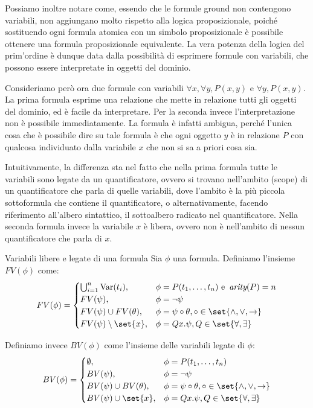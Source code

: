 Possiamo inoltre notare come, essendo che le formule ground non contengono variabili, non aggiungano molto rispetto alla logica proposizionale, poiché sostituendo ogni formula atomica con un simbolo proposizionale è possibile ottenere una formula proposizionale equivalente. La vera potenza della logica del prim'ordine è dunque data dalla possibilità di esprimere formule con variabili, che possono essere interpretate in oggetti del dominio.

Consideriamo però ora due formule con variabili \(\forall x, \forall y, P(x,y)\) e \(\forall y, P(x,y)\).
La prima formula esprime una relazione che mette in relazione tutti gli oggetti del dominio, ed è facile da interpretare.
Per la seconda invece l'interpretazione non è possibile immediatamente. La formula è infatti ambigua, perché l'unica cosa che è possibile dire su tale formula è che ogni oggetto \(y\) è in relazione \(P\) con qualcosa individuato dalla variabile \(x\) che non si sa a priori cosa sia.

Intuitivamente, la differenza sta nel fatto che nella prima formula tutte le variabili sono legate da un quantificatore, ovvero si trovano nell'ambito (scope) di un quantificatore che parla di quelle variabili, dove l'ambito è la più piccola sottoformula che contiene il quantificatore, o alternativamente, facendo riferimento all'albero sintattico, il sottoalbero radicato nel quantificatore. Nella seconda formula invece la variabile \(x\) è libera, ovvero non è nell'ambito di nessun quantificatore che parla di \(x\).

\begin{definition}{Variabili libere e legate di una formula}
  Sia \(\phi\) una formula. Definiamo l'insieme \(FV(\phi)\) come:
  \[FV(\phi) = \begin{cases}
    \bigcup_{i=1}^{n} \Var(t_i), & \phi = P(t_1,\ldots,t_n) \text{ e } \arty(P) = n\\
    FV(\psi), & \phi = \neg \psi\\
    FV(\psi)\cup FV(\theta), & \phi = \psi\circ\theta, \circ \in \set{\land,\lor,\to}\\
    FV(\psi)\setminus\set{x}, & \phi = Q x. \psi, Q\in\set{\forall,\exists}
  \end{cases}\]

  Definiamo invece \(BV(\phi)\) come l'insieme delle variabili legate di \(\phi\):
  \[BV(\phi) = \begin{cases}
    \emptyset, & \phi = P(t_1,\ldots,t_n)\\
    BV(\psi), & \phi = \neg \psi\\
    BV(\psi)\cup BV(\theta), & \phi = \psi\circ\theta, \circ \in \set{\land,\lor,\to}\\
    BV(\psi)\cup\set{x}, & \phi = Q x. \psi, Q\in\set{\forall,\exists}
  \end{cases}\]
\end{definition}

